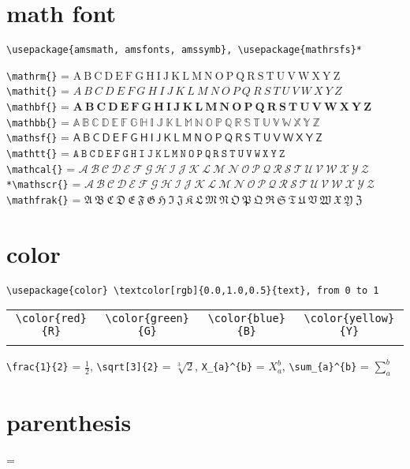 \documentclass[11pt,a4paper]{article}
\begin{document}
\section{math font}
\verb|\usepackage{amsmath, amsfonts, amssymb}, \usepackage{mathrsfs}*|
\begin{center}
	\verb|\mathrm{}| = $\mathrm{A~B~C~D~E~F~G~H~I~J~K~L~M~N~O~P~Q~R~S~T~U~V~W~X~Y~Z}$ \\[0.3em]
	\verb|\mathit{}| = $\mathit{A~B~C~D~E~F~G~H~I~J~K~L~M~N~O~P~Q~R~S~T~U~V~W~X~Y~Z}$ \\[0.3em]
	\verb|\mathbf{}| = $\mathbf{A~B~C~D~E~F~G~H~I~J~K~L~M~N~O~P~Q~R~S~T~U~V~W~X~Y~Z}$ \\[0.3em]
	\verb|\mathbb{}| = $\mathbb{A~B~C~D~E~F~G~H~I~J~K~L~M~N~O~P~Q~R~S~T~U~V~W~X~Y~Z}$ \\[0.3em]
	\verb|\mathsf{}| = $\mathsf{A~B~C~D~E~F~G~H~I~J~K~L~M~N~O~P~Q~R~S~T~U~V~W~X~Y~Z}$ \\[0.3em]
	\verb|\mathtt{}| = $\mathtt{A~B~C~D~E~F~G~H~I~J~K~L~M~N~O~P~Q~R~S~T~U~V~W~X~Y~Z}$ \\[0.3em]
	\verb|\mathcal{}| = $\mathcal{A~B~C~D~E~F~G~H~I~J~K~L~M~N~O~P~Q~R~S~T~U~V~W~X~Y~Z}$ 
	\\[0.3em]
	\verb|*\mathscr{}| = $\mathscr{A~B~C~D~E~F~G~H~I~J~K~L~M~N~O~P~Q~R~S~T~U~V~W~X~Y~Z}$ 
	\\[0.3em]	
	\verb|\mathfrak{}| = $\mathfrak{A~B~C~D~E~F~G~H~I~J~K~L~M~N~O~P~Q~R~S~T~U~V~W~X~Y~Z}$
\end{center}
\section{color}
\verb|\usepackage{color} \textcolor[rgb]{0.0,1.0,0.5}{text}, from 0 to 1| 
\begin{table}[htb]
\centering
\begin{tabular}{cccc}
	\verb|\color{red}{R}| & \verb|\color{green}{G}| & \verb|\color{blue}{B}| & \verb|\color{yellow}{Y}| \\
	\color{red}{R} & \color{green}{G} & \color{blue}{B} & \color{yellow}{Y} \\
	\hline
\end{tabular}
\end{table}

\verb|\frac{1}{2}| = $\frac{1}{2}$, \verb|\sqrt[3]{2}| = $\sqrt[3]{2}$, \verb|X_{a}^{b}| = $X_{a}^{b}$, \verb|\sum_{a}^{b}| = $\sum_{a}^{b}$
\section{parenthesis}
\begin{verbatim*}
= 
\end{verbatim*}
\end{document}
